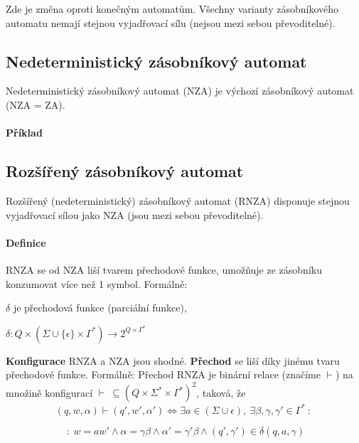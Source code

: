 Zde je změna oproti konečným automatům. Všechny varianty zásobníkového automatu nemají stejnou vyjadřovací sílu (nejsou mezi sebou převoditelné).

\subsection{Nedeterministický zásobníkový automat} Nedeterministický zásobníkový automat (NZA) je výchozí zásobníkový automat (NZA = ZA).

\paragraph*{Příklad} 

\subsection{Rozšířený zásobníkový automat}

Rozšířený (nedeterministický) zásobníkový automat (RNZA) disponuje stejnou vyjadřovací sílou jako NZA (jsou mezi sebou převoditelné).

\paragraph*{Definice} RNZA se od NZA liší tvarem přechodové funkce, umožňuje ze zásobníku konzumovat více než 1 symbol. Formálně:

\begin{compactitem}
    \item $\delta$ je přechodová funkce (parciální funkce), \begin{compactitem}
        \item $\delta : Q \times (\Sigma \cup \{ \epsilon \} \times \Gamma^*) \rightarrow 2^{Q \times \Gamma^*}$
    \end{compactitem}
\end{compactitem}

\textbf{Konfigurace} RNZA a NZA jsou shodné. \textbf{Přechod} se liší díky jinému tvaru přechodové funkce. Formálně: Přechod RNZA je binární relace (značíme $\vdash$) na množině konfigurací $\vdash ~ \subseteq (Q \times \Sigma^* \times \Gamma^*)^2$, taková, že $$ (q, w, \alpha) \vdash (q', w', \alpha') \Leftrightarrow \exists a \in (\Sigma \cup \epsilon), ~ \exists \beta, \gamma, \gamma' \in \Gamma^* ~:~ $$

$$ ~:~ w = aw' \land \alpha = \gamma \beta \land \alpha' = \gamma' \beta \land (q', \gamma') \in \delta(q, a, \gamma) $$


